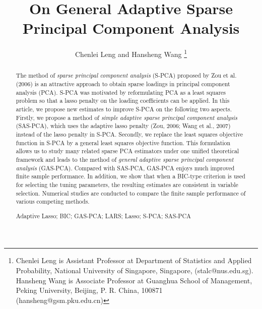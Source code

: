 \documentclass{jcgsf}
\title{On General Adaptive Sparse Principal Component Analysis}
\author{Chenlei Leng and Hansheng Wang \thanks{Chenlei Leng is Assistant Professor at Department of Statistics and Applied Probability, National University of Singapore, Singapore, ({stalc@nus.edu.sg}). Hansheng Wang is Associate Professor at Guanghua School of Management, Peking University, Beijing, P. R. China, 100871 ({hansheng@gsm.pku.edu.cn})}}
\begin{document}
\maketitle

\begin{abstract}
The method of {\it sparse principal component
analysis} (S-PCA) proposed by Zou et al. (2006)
is an attractive approach to obtain sparse loadings in principal component
analysis (PCA).  S-PCA was motivated by reformulating PCA as a least squares
problem so that a lasso penalty on the loading coefficients can be applied.
In this article, we propose new estimates to improve S-PCA on the following
two aspects. Firstly, we propose a method of
{\it simple adaptive sparse principal component analysis} (SAS-PCA), which uses
the adaptive lasso penalty
(Zou, 2006; Wang et al., 2007) instead of the lasso penalty in S-PCA.
Secondly, we replace the least squares objective function in
S-PCA by a general least squares objective function. This formulation allows
us to study many related sparse PCA estimators under one unified theoretical framework
and leads to the method of {\it general adaptive sparse principal component analysis} (GAS-PCA).
Compared with SAS-PCA, GAS-PCA enjoys much improved finite sample performance.
In addition, we show that when a BIC-type criterion is used for selecting the
tuning parameters, the resulting estimates are consistent in variable selection. Numerical studies are conducted to
compare the finite sample performance of various competing methods.\\
\begin{keywords}
Adaptive Lasso; BIC; GAS-PCA; LARS; Lasso; S-PCA; SAS-PCA
\end{keywords}
\end{abstract}




\bigskip



\end{document}
